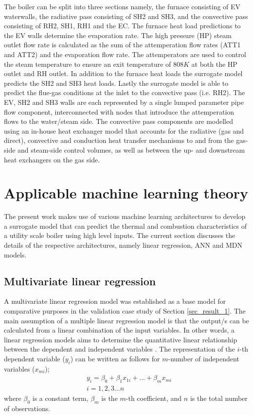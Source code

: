 \documentclass[a4paper,fleqn]{cas-sc}
\begin{document}
The boiler can be split into three sections namely, the furnace consisting of EV waterwalls, the radiative pass consisting of SH2 and SH3, and the convective pass consisting of RH2, SH1, RH1 and the EC. The furnace heat load predictions to the EV walls determine the evaporation rate. The high pressure (HP) steam outlet flow rate is calculated as the sum of the attemperation flow rates (ATT1 and ATT2) and the evaporation flow rate. The attemperators are used to control the steam temperature to ensure an exit temperature of $808K$ at both the HP outlet and RH outlet. In addition to the furnace heat loads the surrogate model predicts the SH2 and SH3 heat loads. Lastly the surrogate model is able to predict the flue-gas conditions at the inlet to the convective pass (i.e. RH2). The EV, SH2 and SH3 walls are each represented by a single lumped parameter pipe flow component, interconnected with nodes that introduce the attemperation flows to the water/steam side. The convective pass components are modelled using an in-house heat exchanger model that accounts for the radiative (gas and direct), convective and conduction heat transfer mechanisms to and from the gas-side and steam-side control volumes, as well as between the up- and downstream heat exchangers on the gas side.

\section{Applicable machine learning theory}
The present work makes use of various machine learning architectures to develop a surrogate model that can predict the thermal and combustion characteristics of a utility scale boiler using high level inputs. The current section discusses the details of the respective architectures, namely linear regression, ANN and MDN models.
\newpage
\subsection{Multivariate linear regression}
A multivariate linear regression model was established as a base model for comparative purposes in the validation case study of Section \ref{sec_result_1}. The main assumption of a multiple linear regression model is that the output/s can be calculated from a linear combination of the input variables. In other words, a linear regression models aims to determine the quantitative linear relationship between the dependent and independent variables \cite{Wen2022}. The representation of the $i$-th dependent variable ($y_i$) can be written as follows for $m$-number of independent variables ($x_{mi}$);
\begin{equation}
\begin{split}
&y_i = \beta_0+\beta_1 x_{1i}+...+\beta_m x_{mi}\\
&i = 1,2,3...n
\end{split}
\end{equation}
where $\beta_0$ is a constant term, $\beta_{m}$ is the $m$-th coefficient, and $n$ is the total number of observations.\\
 
\end{document}
